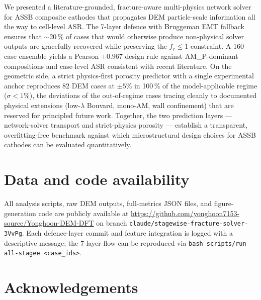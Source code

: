 \documentclass[11pt, a4paper]{article}
\begin{document}
We presented a literature-grounded, fracture-aware multi-physics
network solver for ASSB composite cathodes that propagates DEM
particle-scale information all the way to cell-level ASR. The 7-layer
defence with Bruggeman EMT fallback ensures that $\sim$20\,\% of
cases that would otherwise produce non-physical solver outputs are
gracefully recovered while preserving the $f_r \le 1$ constraint.
A 160-case ensemble yields a Pearson $+0.967$ design rule against
AM\_P-dominant compositions and case-level ASR consistent with
recent literature.  On the geometric side, a strict physics-first
porosity predictor with a single experimental anchor reproduces 82
DEM cases at $\pm 5\%$ in 100\,\% of the model-applicable regime
($\sigma < 1\%$), the deviations of the out-of-regime cases tracing
cleanly to documented physical extensions (low-$\lambda$ Bouvard,
mono-AM, wall confinement) that are reserved for principled future
work. Together, the two prediction layers --- network-solver
transport and strict-physics porosity --- establish a transparent,
overfitting-free benchmark against which microstructural design
choices for ASSB cathodes can be evaluated quantitatively.

\section*{Data and code availability}

All analysis scripts, raw DEM outputs, full-metrics JSON files,
and figure-generation code are publicly available at
\url{https://github.com/yonghoon7153-source/Yonghoon-DEM-DFT}
on branch \texttt{claude/stagewise-fracture-solver-3VvPg}. Each
defence-layer commit and feature integration is logged with a
descriptive message; the 7-layer flow can be reproduced via
\texttt{bash scripts/run all-stagee \textless{}case\_ids\textgreater{}}.

\section*{Acknowledgements}



\end{document}
